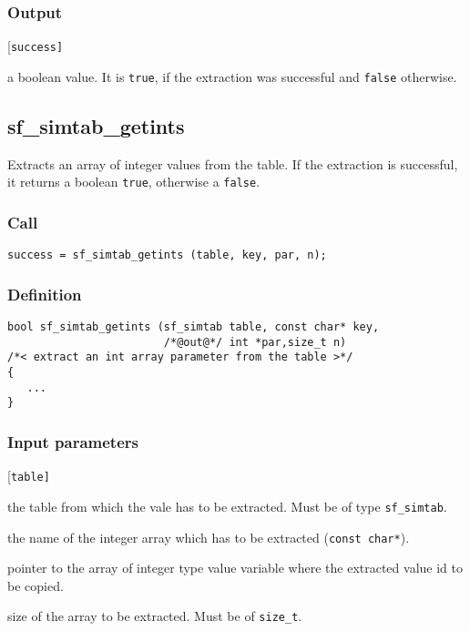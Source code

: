 \subsubsection*{Output}
\begin{desclist}{\tt }{\quad}[\tt success]
   \setlength\itemsep{0pt}
   \item[success] a boolean value. It is \texttt{true}, if the extraction was successful and \texttt{false} otherwise.
\end{desclist}




\subsection{{sf\_simtab\_getints}}\label{sec:sf_simtab_getints}
Extracts an array of integer values from the table. If the extraction is successful, it returns a boolean \texttt{true}, otherwise a \texttt{false}. 

\subsubsection*{Call}
\begin{verbatim}success = sf_simtab_getints (table, key, par, n);\end{verbatim}

\subsubsection*{Definition}
\begin{verbatim}
bool sf_simtab_getints (sf_simtab table, const char* key,
                        /*@out@*/ int *par,size_t n)
/*< extract an int array parameter from the table >*/
{    
   ...
}
\end{verbatim}

\subsubsection*{Input parameters}
\begin{desclist}{\tt }{\quad}[\tt table]
   \setlength\itemsep{0pt}
   \item[table] the table from which the vale has to be extracted. Must be of type \texttt{sf\_simtab}.
   \item[key]   the name of the integer array which has to be extracted (\texttt{const char*}).
   \item[par]   pointer to the array of integer type value variable where the extracted  value id to be copied.
   \item[n]     size of the array to be extracted. Must be of \texttt{size\_t}.
\end{desclist}

